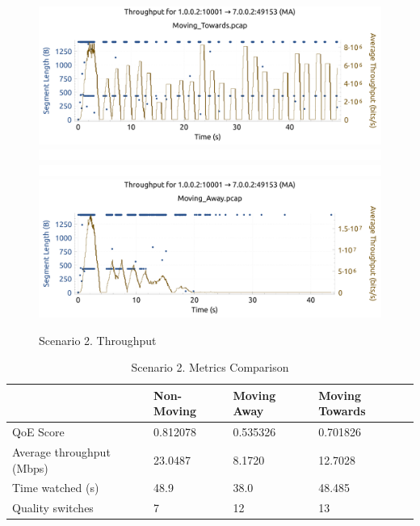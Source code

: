 \begin{figure}[h]
    \centering    
    \includegraphics[width=\textwidth]{img/s2c2_1.pdf}
    \includegraphics[width=\textwidth]{img/space.png}
    \includegraphics[width=\textwidth]{img/space.png}
    \includegraphics[width=\textwidth]{img/s2c2_2.pdf}
    \caption{Scenario 2. Throughput}
    \label{fig:s2c2}
\end{figure}


\begin{table}[]
    \centering
    \begin{tabular}{@{}llll@{}}
    \toprule
                              & Non-Moving & Moving Away & Moving Towards \\ \midrule
    QoE Score                 & 0.812078   & 0.535326    & 0.701826       \\
    Average throughput (Mbps) & 23.0487    & 8.1720      & 12.7028        \\
    Time watched (s)          & 48.9       & 38.0        & 48.485         \\
    Quality switches          & 7          & 12          & 13             \\ \bottomrule
    \end{tabular}
    \caption{Scenario 2. Metrics Comparison}
    \label{table:s2t1}
\end{table}

